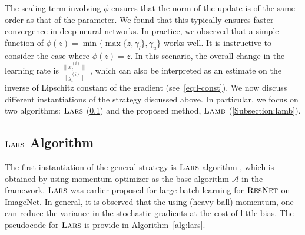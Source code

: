 The scaling term involving $\phi$ ensures that the norm of the update is of the same order as that of the parameter. We found that this typically ensures faster convergence in deep neural networks. In practice, we observed that a simple function of $\phi(z) = \min\{\max\{z, \gamma_l\}, \gamma_u\}$ works well. It is instructive to consider the case where $\phi(z) = z$. In this scenario, the overall change in the learning rate is $\tfrac{\|x_t^{(i)}\|}{\|g_t^{(i)}\|}$ , which can also be interpreted as an estimate on the inverse of Lipschitz constant of the gradient (see~\eqref{eq:l-const}). We now discuss different instantiations of the strategy discussed above. 
In particular, we focus on two algorithms: $\textsc{Lars}$ (\ref{Subsection:lars}) and the proposed method, $\textsc{Lamb}$ (\ref{Subsection:lamb}).

\subsection{$\textsc{Lars}$ Algorithm}
\label{Subsection:lars}

The first instantiation of the general strategy is $\textsc{Lars}$ algorithm \citep{you2017scaling}, which is obtained by using momentum optimizer as the base algorithm $\mathcal{A}$ in the framework. $\textsc{Lars}$ was earlier proposed for large batch learning for $\textsc{ResNet}$ on ImageNet. In general, it is observed that the using (heavy-ball) momentum, one can reduce the variance in the stochastic gradients at the cost of little bias. The pseudocode for $\textsc{Lars}$ is provide in Algorithm~\ref{alg:lars}.


